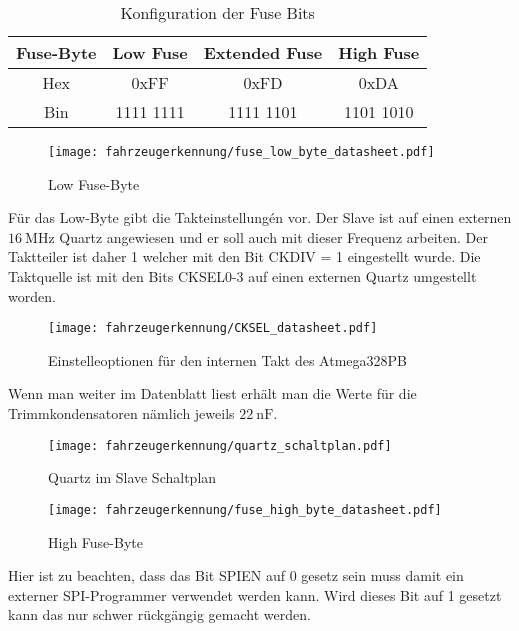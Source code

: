 \begin{table}[H]
    \centering
    \begin{tabular}{|c|c|c|c|}
        \hline
        Fuse-Byte & \textbf{Low Fuse} & \textbf{Extended Fuse} & \textbf{High Fuse} \\ \hline
        Hex       & 0xFF              & 0xFD                   & 0xDA               \\ \hline
        Bin       & 1111 1111         & 1111 1101              & 1101 1010          \\ \hline
    \end{tabular}
    \caption{Konfiguration der Fuse Bits}
\end{table}


\begin{figure}[H]
    \centering
    \texttt{[image: fahrzeugerkennung/fuse\_low\_byte\_datasheet.pdf]}
    \caption{Low Fuse-Byte}
\end{figure}

Für das Low-Byte gibt die Takteinstellungén vor. Der Slave ist auf einen externen $\SI{16}{\mega\hertz}$ Quartz angewiesen und er soll auch mit dieser Frequenz arbeiten. 
Der Taktteiler ist daher 1 welcher mit den Bit CKDIV = 1 eingestellt wurde. Die Taktquelle ist mit den Bits CKSEL0-3 auf einen externen Quartz umgestellt worden.

\begin{figure}[H]
    \centering
    \texttt{[image: fahrzeugerkennung/CKSEL\_datasheet.pdf]}
    \caption{Einstelleoptionen für den internen Takt des Atmega328PB}
\end{figure}

Wenn man weiter im Datenblatt liest erhält man die Werte für die Trimmkondensatoren nämlich jeweils $\SI{22}{\nano\farad}$.

\begin{figure}[H]
    \centering
    \texttt{[image: fahrzeugerkennung/quartz\_schaltplan.pdf]}
    \caption{Quartz im Slave Schaltplan}
\end{figure}



\begin{figure}[H]
    \centering
    \texttt{[image: fahrzeugerkennung/fuse\_high\_byte\_datasheet.pdf]}
    \caption{High Fuse-Byte}
\end{figure}

Hier ist zu beachten, dass das Bit SPIEN auf 0 gesetz sein muss damit ein externer SPI-Programmer verwendet werden kann. Wird dieses Bit auf 1 gesetzt kann das nur schwer rückgängig gemacht werden.


